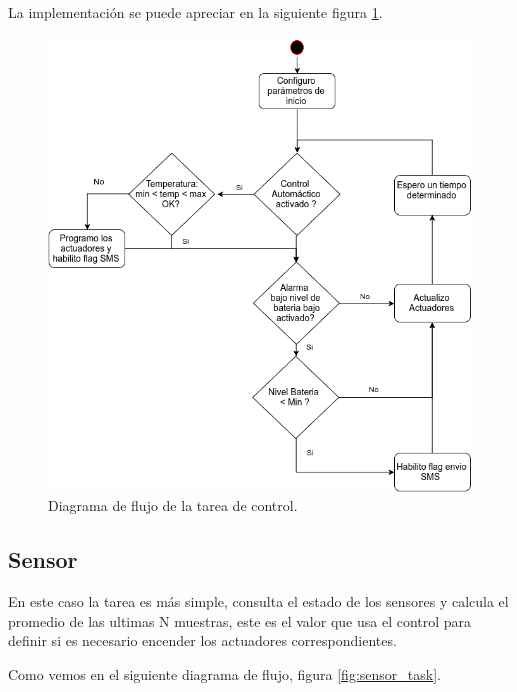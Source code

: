 La implementación se puede apreciar en la siguiente figura \ref{fig:control_task}.

\begin{figure}[!hp]
  \centering
  \includegraphics[scale=.5]{./Figures/control_task.png}
  \caption{Diagrama de flujo de la tarea de control.}
  \label{fig:control_task}
\end{figure}


\subsection*{Sensor}
 En este caso la tarea es más simple, consulta el estado de los sensores y calcula el promedio de las ultimas N muestras, este es el valor que usa el control para definir si es necesario encender los actuadores correspondientes.

 Como vemos en el siguiente diagrama de flujo, figura \ref{fig:sensor_task}.

